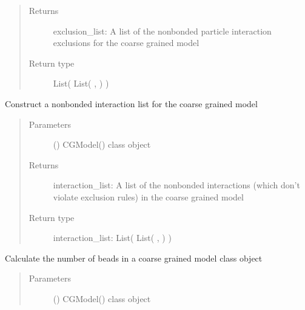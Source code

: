 \documentclass[letterpaper,12pt,english,openany,oneside]{sphinxmanual}
\begin{document}
\begin{fulllineitems}
\begin{fulllineitems}
\begin{quote}
\begin{description}
\item[{Returns}] \leavevmode
exclusion\_list: A list of the nonbonded particle interaction exclusions for the coarse grained model

\item[{Return type}] \leavevmode
List( List( ,  ) )

\end{description}\end{quote}

\end{fulllineitems}


\begin{fulllineitems}
\label{\detokenize{cg_model:cg_model.cgmodel.CGModel.get_nonbonded_interaction_list}}
Construct a nonbonded interaction list for the coarse grained model
\begin{quote}\begin{description}
\item[{Parameters}] \leavevmode
{} () \textendash{} CGModel() class object

\item[{Returns}] \leavevmode
interaction\_list: A list of the nonbonded interactions (which don’t violate exclusion rules) in the coarse grained model

\item[{Return type}] \leavevmode
interaction\_list: List( List( ,  ) )

\end{description}\end{quote}

\end{fulllineitems}


\begin{fulllineitems}
\label{\detokenize{cg_model:cg_model.cgmodel.CGModel.get_num_beads}}
Calculate the number of beads in a coarse grained model class object
\begin{quote}\begin{description}
\item[{Parameters}] \leavevmode
{} () \textendash{} CGModel() class object


\end{description}
\end{quote}
\end{fulllineitems}
\end{fulllineitems}
\end{document}

